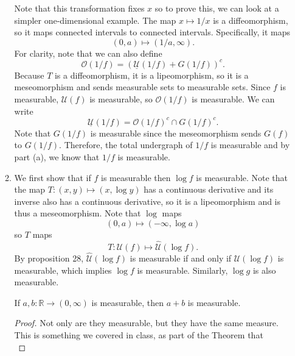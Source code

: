 \documentclass{article}
\begin{document}
\begin{enumerate}
\begin{enumerate}
        Note that this transformation fixes $x$ so to prove this, we can look at a simpler one-dimensional example. The map $x \mapsto 1/x$ is a diffeomorphism, so it maps connected intervals to connected intervals. Specifically, it maps 
        \begin{equation}
            (0,a) \mapsto (1/a,\infty).
        \end{equation}
        For clarity, note that we can also define 
        \begin{equation}
            \mathcal{O}(1/f) = (\underline{\mathcal{U}}(1/f) + G(1/f))^c.
        \end{equation}
        Because $T$ is a diffeomorphism, it is a lipeomorphism, so it is a meseomorphism and sends measurable sets to measurable sets. Since $f$ is measurable, $\mathcal{U}(f)$ is measurable, so $\mathcal{O}(1/f)$ is measurable. We can write
        \begin{equation}
            \underline{\mathcal{U}}(1/f) = \mathcal{O}(1/f)^c \cap G(1/f)^c.
        \end{equation}
        Note that $G(1/f)$ is measurable since the meseomorphism sends $G(f)$ to $G(1/f).$ Therefore, the total undergraph of $1/f$ is measurable and by part (a), we know that $1/f$ is measurable.
        \item We first show that if $f$ is measurable then $\log f$ is measurable. Note that the map $T:(x,y) \mapsto (x,\log y)$ has a continuous derivative and its inverse also has a continuous derivative, so it is a lipeomorphism and is thus a meseomorphism. Note that $\log$ maps
        \begin{equation}
            (0,a) \mapsto (-\infty, \log a)
        \end{equation}
        so $T$ maps 
        \begin{equation}
            T: \mathcal{U}(f) \mapsto \hat{\mathcal{U}}(\log f).
        \end{equation}
        By proposition 28, $\hat{\mathcal{U}}(\log f)$ is measurable if and only if $\mathcal{U}(\log f)$ is measurable, which implies $\log f$ is measurable. Similarly, $\log g$ is also measurable.
        \begin{lemma}
            If $a,b:\mathbb{R} \to (0,\infty)$ is measurable, then $a+b$ is measurable.
            \begin{proof}
                Not only are they measurable, but they have the same measure. This is something we covered in class, as part of the Theorem that 
                \begin{equation}

\end{equation}
\end{proof}
\end{lemma}
\end{enumerate}
\end{enumerate}
\end{document}
